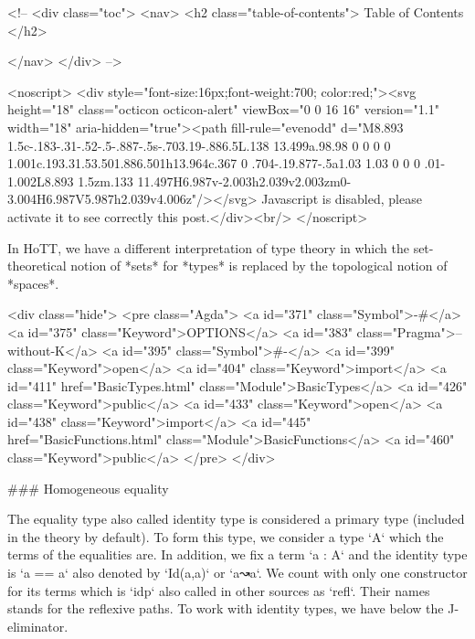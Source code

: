   <!-- 
  <div class="toc">
    <nav>
    <h2 class="table-of-contents"> Table of Contents </h2>
      

    </nav>
  </div>
   -->

  <noscript>
  <div style="font-size:16px;font-weight:700; color:red;"><svg height="18" class="octicon octicon-alert" viewBox="0 0 16 16" version="1.1" width="18" aria-hidden="true"><path fill-rule="evenodd" d="M8.893 1.5c-.183-.31-.52-.5-.887-.5s-.703.19-.886.5L.138 13.499a.98.98 0 0 0 0 1.001c.193.31.53.501.886.501h13.964c.367 0 .704-.19.877-.5a1.03 1.03 0 0 0 .01-1.002L8.893 1.5zm.133 11.497H6.987v-2.003h2.039v2.003zm0-3.004H6.987V5.987h2.039v4.006z"/></svg> Javascript is disabled, please activate it to see correctly this post.</div><br/>
  </noscript>

  In HoTT, we have a different interpretation of type theory in which the
set-theoretical notion of *sets* for *types* is replaced by the topological
notion of *spaces*.

<div class="hide">
<pre class="Agda">
<a id="371" class="Symbol">{-#</a> <a id="375" class="Keyword">OPTIONS</a> <a id="383" class="Pragma">--without-K</a> <a id="395" class="Symbol">#-}</a>
<a id="399" class="Keyword">open</a> <a id="404" class="Keyword">import</a> <a id="411" href="BasicTypes.html" class="Module">BasicTypes</a>     <a id="426" class="Keyword">public</a>
<a id="433" class="Keyword">open</a> <a id="438" class="Keyword">import</a> <a id="445" href="BasicFunctions.html" class="Module">BasicFunctions</a> <a id="460" class="Keyword">public</a>
</pre>
</div>

### Homogeneous equality

The equality type also called identity type is considered a primary type
(included in the theory by default). To form this type, we consider a type `A`
which the terms of the equalities are. In addition, we fix a term `a : A` and
the identity type is `a == a` also denoted by `Id(a,a)` or `a↝a`. We count with
only one constructor for its terms which is `idp` also called in other sources
as `refl`. Their names stands for the reflexive paths. To work with identity
types, we have below the J-eliminator.

